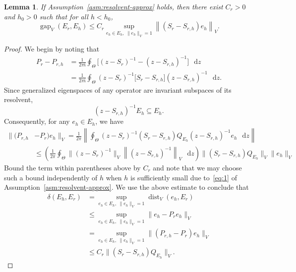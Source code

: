 \documentclass[12pt, oneside, reqno]{amsart}
\newtheorem{lemma}[theorem]{Lemma}
\theoremstyle{remark}
\newcommand{\ii}{\mathfrak{i}}
\newcommand{\diff}{\mathop{}\!\mathrm{d}}
\DeclareMathOperator{\dist}{dist}
\DeclareMathOperator{\gap}{gap}
\newcommand{\vT}{\varTheta}
\newcommand{\dz}{\diff{z}}
\newcommand{\Srh}{S_{r, h}}
\newcommand{\Prh}{P_{r, h}}
\begin{document}
\begin{lemma}
  \label{lem:gap-bound}
  If Assumption~\ref{asm:resolvent-approx} holds, 
  then there exist $C_r>0$ and $h_0>0$ such
  that for all $h < h_0$,
  \begin{equation}
    \label{eq:gapEEh}
    \gap_V( E_r, E_h) \le C_r
    \sup_{ e_h \in E_h, \; \| e_h \|_V = 1 }
    \left\| ( S_r - \Srh) e_h \right\|_V.
  \end{equation}
\end{lemma}
\begin{proof}
  We begin by noting that 
  \begin{align*}
    P_r - \Prh 
    & =
      \frac{1}{2\pi \ii} \oint_\vT
    \Big[ (z - S_r)^{-1} - (z - \Srh)^{-1}   \Big] \, \dz
    \\
    & =
      \frac{1}{2\pi \ii} \oint_\vT
      (z - S_r)^{-1}
      \big[  S_r - \Srh   \big]  (z - \Srh)^{-1} \, \dz.
  \end{align*}
  Since generalized eigenspaces of any operator are invariant
  subspaces of its resolvent,
  \[
    (z - \Srh)^{-1} E_h \subseteq E_h.
  \]
  Consequently,   for any $e_h \in E_h$, we  have
  \begin{align*}
    \| (\Prh& - P_r) e_h \|_V
     =      
      \frac{1}{2\pi}
      \left\|
      \oint_\vT
      (z - S_r)^{-1}
      (S_r - \Srh  ) Q_{E_h}  (z - \Srh)^{-1} e_h \, \dz
      \right\|
    \\
    & \le      
      \left(\frac{1}{2\pi}
      \oint_\vT
      \|(z - S_r)^{-1}\|_V
      \left\| (z - \Srh)^{-1} \right\|_V \,
      \dz
      \right)
      \| (S_r - \Srh  )Q_{E_h} \|_V  \| e_h\|_V
  \end{align*}
  Bound the term within parentheses above by $C_r$ and note that we
  may choose such a bound independently of $h$ when $h$ is
  sufficiently small due to~\eqref{eq:1} of Assumption~\ref{asm:resolvent-approx}.
  We use the above estimate
  to conclude that
  \begin{align}
    \nonumber 
    \delta(E_h, E_r)
    & = \sup_{e_h \in E_h, \; \| e_h \|_V = 1 } \dist_V(e_h, E_r)
    \\ \nonumber 
    & \le  \sup_{e_h \in E_h, \; \| e_h \|_V = 1 }\| e_h - P_r e_h \|_V
    \\ \nonumber 
    & =  \sup_{e_h \in E_h, \; \| e_h \|_V = 1 }\| (\Prh - P_r) e_h \|_V
    \\ \label{eq:6}
    & \le C_r \| (S_r - \Srh  ) Q_{E_h} \|_V.
  \end{align}

\end{proof}
\end{document}
